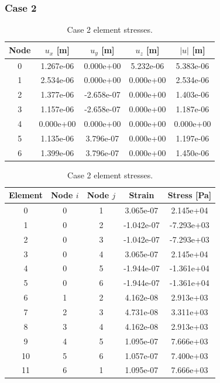 \documentclass{article}
\begin{document}
\subsubsection*{Case 2}
\begin{table}[htbp]
\centering
\scriptsize
\begin{minipage}[t]{0.48\textwidth}
\centering
\caption{Case 2 nodal displacements.}
\begin{tabular}{c c c c c}
\toprule
Node & $u_x$ [m] & $u_y$ [m] & $u_z$ [m] & $|u|$ [m] \\
\midrule
0 & 1.267e-06 & 0.000e+00 & 5.232e-06 & 5.383e-06 \\
1 & 2.534e-06 & 0.000e+00 & 0.000e+00 & 2.534e-06 \\
2 & 1.377e-06 & -2.658e-07 & 0.000e+00 & 1.403e-06 \\
3 & 1.157e-06 & -2.658e-07 & 0.000e+00 & 1.187e-06 \\
4 & 0.000e+00 & 0.000e+00 & 0.000e+00 & 0.000e+00 \\
5 & 1.135e-06 & 3.796e-07 & 0.000e+00 & 1.197e-06 \\
6 & 1.399e-06 & 3.796e-07 & 0.000e+00 & 1.450e-06 \\
\bottomrule
\end{tabular}
\end{minipage}\hfill
\begin{minipage}[t]{0.48\textwidth}
\centering
\caption{Case 2 element stresses.}
\begin{tabular}{c c c c c}
\toprule
Element & Node $i$ & Node $j$ & Strain & Stress [Pa] \\
\midrule
0 & 0 & 1 & 3.065e-07 & 2.145e+04 \\
1 & 0 & 2 & -1.042e-07 & -7.293e+03 \\
2 & 0 & 3 & -1.042e-07 & -7.293e+03 \\
3 & 0 & 4 & 3.065e-07 & 2.145e+04 \\
4 & 0 & 5 & -1.944e-07 & -1.361e+04 \\
5 & 0 & 6 & -1.944e-07 & -1.361e+04 \\
6 & 1 & 2 & 4.162e-08 & 2.913e+03 \\
7 & 2 & 3 & 4.731e-08 & 3.311e+03 \\
8 & 3 & 4 & 4.162e-08 & 2.913e+03 \\
9 & 4 & 5 & 1.095e-07 & 7.666e+03 \\
10 & 5 & 6 & 1.057e-07 & 7.400e+03 \\
11 & 6 & 1 & 1.095e-07 & 7.666e+03 \\
\bottomrule
\end{tabular}
\end{minipage}
\end{table}
\end{document}
